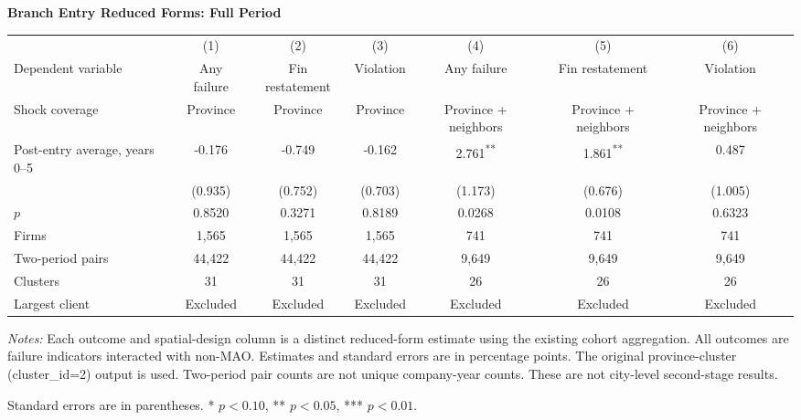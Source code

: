 \documentclass[10pt]{article}
\newcommand{\sym}[1]{\textsuperscript{#1}}
\begin{document}
\begin{minipage}{23.60cm}
\fontsize{10}{12}\selectfont
\setlength{\tabcolsep}{4pt}\renewcommand{\arraystretch}{1.08}
{\large\bfseries Branch Entry Reduced Forms: Full Period}\par\medskip
\begin{tabular*}{\linewidth}{@{\extracolsep{\fill}}lcccccc@{}}
\toprule
 & (1) & (2) & (3) & (4) & (5) & (6) \\
Dependent variable & Any failure & Fin restatement & Violation & Any failure & Fin restatement & Violation \\
Shock coverage & Province & Province & Province & Province + neighbors & Province + neighbors & Province + neighbors \\
\midrule
Post-entry average, years 0--5 & -0.176 & -0.749 & -0.162 & 2.761\sym{**} & 1.861\sym{**} & 0.487 \\
 & (0.935) & (0.752) & (0.703) & (1.173) & (0.676) & (1.005) \\
$p$ & 0.8520 & 0.3271 & 0.8189 & 0.0268 & 0.0108 & 0.6323 \\
\midrule
Firms & 1,565 & 1,565 & 1,565 & 741 & 741 & 741 \\
Two-period pairs & 44,422 & 44,422 & 44,422 & 9,649 & 9,649 & 9,649 \\
Clusters & 31 & 31 & 31 & 26 & 26 & 26 \\
Largest client & Excluded & Excluded & Excluded & Excluded & Excluded & Excluded \\
\bottomrule\end{tabular*}\par\medskip
\fontsize{9}{11}\selectfont\textit{Notes:} Each outcome and spatial-design column is a distinct reduced-form estimate using the existing cohort aggregation. All outcomes are failure indicators interacted with non-MAO. Estimates and standard errors are in percentage points. The original province-cluster (cluster\_id=2) output is used. Two-period pair counts are not unique company-year counts. These are not city-level second-stage results.
\par Standard errors are in parentheses. * $p<0.10$, ** $p<0.05$, *** $p<0.01$.
\end{minipage}
\end{document}
